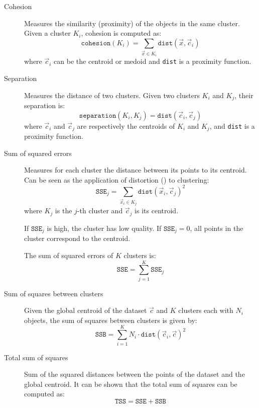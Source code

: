 \begin{description}
    \item[Cohesion] 
        Measures the similarity (proximity) of the objects in the same cluster.
        Given a cluster $K_i$, cohesion is computed as:
        \[ \texttt{cohesion}(K_i) = \sum_{\vec{x} \in K_i} \texttt{dist}(\vec{x}, \vec{c}_i) \]
        where $\vec{c}_i$ can be the centroid or medoid
        and \texttt{dist} is a proximity function.

    \item[Separation] 
        Measures the distance of two clusters.
        Given two clusters $K_i$ and $K_j$, their separation is:
        \[ \texttt{separation}(K_i, K_j) = \texttt{dist}(\vec{c}_i, \vec{c}_j) \]
        where $\vec{c}_i$ and $\vec{c}_j$ are respectively the centroids of $K_i$ and $K_j$, and \texttt{dist} is a proximity function.

    \item[Sum of squared errors] 
        Measures for each cluster the distance between its points to its centroid.
        Can be seen as the application of distortion () to clustering:
        \[ \texttt{SSE}_j = \sum_{\vec{x}_i \in K_j} \texttt{dist}(\vec{x}_i, \vec{c}_j)^2 \]
        where $K_j$ is the $j$-th cluster and $\vec{c}_j$ is its centroid.

        If $\texttt{SSE}_j$ is high, the cluster has low quality.
        If $\texttt{SSE}_j = 0$, all points in the cluster correspond to the centroid.

        The sum of squared errors of $K$ clusters is:
        \[ \texttt{SSE} = \sum_{j=1}^{K} \texttt{SSE}_j \]

    \item[Sum of squares between clusters] 
        Given the global centroid of the dataset $\vec{c}$ and
        $K$ clusters each with $N_i$ objects,
        the sum of squares between clusters is given by:
        \[ \texttt{SSB} = \sum_{i=1}^{K} N_i \cdot \texttt{dist}(\vec{c}_i, \vec{c})^2 \]

    \item[Total sum of squares] 
        Sum of the squared distances between the points of the dataset and the global centroid.
        It can be shown that the total sum of squares can be computed as:
        \[ \texttt{TSS} = \texttt{SSE} + \texttt{SSB} \]


\end{description}
